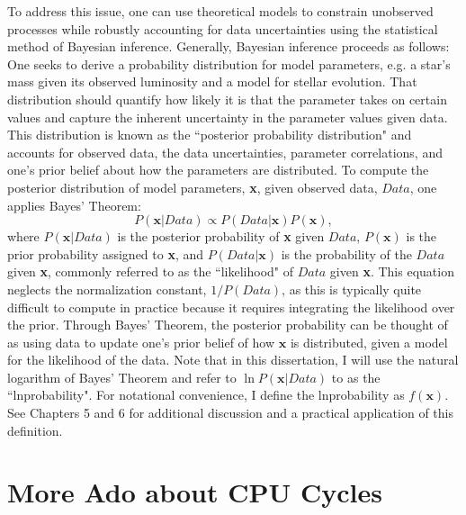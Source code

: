 To address this issue, one can use theoretical models to constrain unobserved processes while robustly accounting for data uncertainties using the statistical method of Bayesian inference. Generally, Bayesian inference proceeds as follows:  One seeks to derive a probability distribution for model parameters, e.g. a star's mass given its observed luminosity and a model for stellar evolution.  That distribution should quantify how likely it is that the parameter takes on certain values and capture the inherent uncertainty in the parameter values given data.  This distribution is known as the ``posterior probability distribution" and accounts for observed data, the data uncertainties, parameter correlations, and one's prior belief about how the parameters are distributed. To compute the posterior distribution of model parameters, \textbf{x}, given observed data, $Data$, one applies Bayes' Theorem: 
\begin{equation} \label{intro:eqn:bayes}
P(\textbf{x} | Data) \propto P(Data | \textbf{x}) P(\textbf{x}),
\end{equation}
where $P(\textbf{x} | Data)$ is the posterior probability of \textbf{x} given $Data$, $P(\textbf{x})$ is the prior probability assigned to \textbf{x}, and $P(Data | \textbf{x})$ is the probability of the $Data$ given \textbf{x}, commonly referred to as the ``likelihood" of $Data$ given \textbf{x}. This equation neglects the normalization constant, $1/P(Data)$, as this is typically quite difficult to compute in practice because it requires integrating the likelihood over the prior. Through Bayes' Theorem, the posterior probability can be thought of as using data to update one's prior belief of how $\textbf{x}$ is distributed, given a model for the likelihood of the data. Note that in this dissertation, I will use the natural logarithm of Bayes' Theorem and refer to $\ln P(\textbf{x} | Data)$ to as the ``lnprobability". For notational convenience, I define the lnprobability as $f(\textbf{x})$. See Chapters 5 and 6 for additional discussion and a practical application of this definition. 

\section{More Ado about CPU Cycles}

